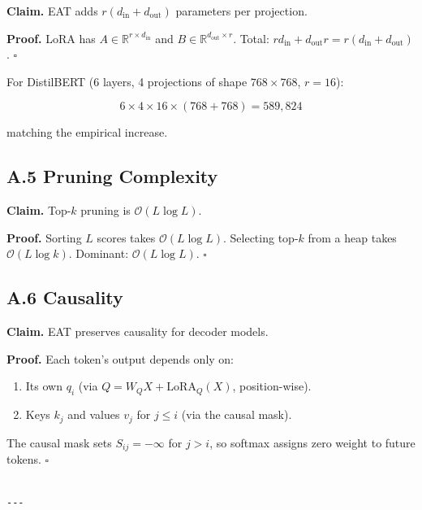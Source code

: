 \textbf{Claim.} EAT adds $r(d_\text{in} + d_\text{out})$ parameters per projection.

\textbf{Proof.} LoRA has $A \in \mathbb{R}^{r \times d_\text{in}}$ and 
$B \in \mathbb{R}^{d_\text{out} \times r}$. Total: $r d_\text{in} + d_\text{out} r = r(d_\text{in} + d_\text{out})$. $\square$

For DistilBERT (6 layers, 4 projections of shape $768 \times 768$, $r = 16$):

\[
6 \times 4 \times 16 \times (768 + 768) = 589{,}824
\]

matching the empirical increase.

\subsection{A.5 Pruning Complexity}

\textbf{Claim.} Top-$k$ pruning is $\mathcal{O}(L \log L)$.

\textbf{Proof.} Sorting $L$ scores takes $\mathcal{O}(L \log L)$. Selecting top-$k$ 
from a heap takes $\mathcal{O}(L \log k)$. Dominant: $\mathcal{O}(L \log L)$. $\square$

\subsection{A.6 Causality}

\textbf{Claim.} EAT preserves causality for decoder models.

\textbf{Proof.} Each token's output depends only on:

\begin{enumerate}
\item Its own $q_i$ (via $Q = W_Q X + \text{LoRA}_Q(X)$, position-wise).
\item Keys $k_j$ and values $v_j$ for $j \leq i$ (via the causal mask).

\end{enumerate}
The causal mask sets $S_{ij} = -\infty$ for $j > i$, so softmax assigns zero 
weight to future tokens. $\square$
\begin{lstlisting}

---
\end{lstlisting}